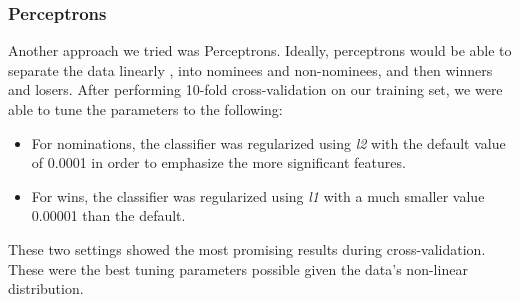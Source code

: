 \documentclass[journal,transmag]{IEEEtran}
\begin{document}
			\subsubsection{Perceptrons}
			Another approach we tried was Perceptrons. Ideally, perceptrons would be able to separate the data linearly \cite{perceptron}, into nominees and non-nominees, and then winners and losers. After performing 10-fold cross-validation on our training set, we were able to tune the parameters to the following:
			\begin{itemize}
				\item For nominations, the classifier was regularized using \emph{l2} with the default value of 0.0001 in order to emphasize the more significant features.
				\item For wins, the classifier was regularized using \emph{l1} with a much smaller value 0.00001 than the default.
			\end{itemize}
			These two settings showed the most promising results during cross-validation.
			These were the best tuning parameters possible given the data's non-linear distribution.
			
\end{document}
